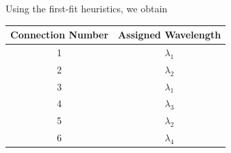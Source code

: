 \documentclass[a4paper]{article}
\begin{document}
Using the first-fit heuristics, we obtain

\begin{table}[h]
\Large
\centering
\begin{tabular}{|c|c|}
\hline
Connection Number&Assigned Wavelength
\\\hline
1&$\lambda_1$
\\\hline
2&$\lambda_2$
\\\hline
3&$\lambda_1$
\\\hline
4&$\lambda_3$
\\\hline
5&$\lambda_2$
\\\hline
6&$\lambda_4$
\\\hline
\end{tabular}
\end{table}
\end{document}
